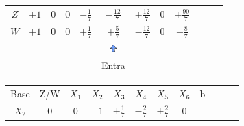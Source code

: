 \documentclass{beamer}
\begin{document}
\begin{frame}
{\begin{table}
\begin{tabular}{c c c c c c c c c c c c}
				\cellcolor{blue!100} \color{white} $\scriptstyle Z$
				& \cellcolor{yellow!50} $\scriptstyle +1$
				& \cellcolor{yellow!50} $\scriptstyle 0$
				& \cellcolor{yellow!50} $\scriptstyle 0$
				& \cellcolor{yellow!50} $\scriptstyle -\frac{1}{7}$
				& \cellcolor{gray!50} $\scriptstyle -\frac{12}{7}$
				& \cellcolor{yellow!50} $\scriptstyle +\frac{12}{7}$
				& \cellcolor{yellow!50} $\scriptstyle 0$ 
				& \cellcolor{yellow!50} $\scriptstyle +\frac{90}{7}$  \\
				\cellcolor{blue!100} \color{white} $\scriptstyle W$
				& \cellcolor{yellow!90} $\scriptstyle +1$
				& \cellcolor{yellow!90} $\scriptstyle 0$
				& \cellcolor{yellow!90} $\scriptstyle 0$
				& \cellcolor{yellow!90} $\scriptstyle +\frac{1}{7}$
				& \cellcolor{gray!50} $\scriptstyle +\frac{5}{7}$
				& \cellcolor{yellow!90} $\scriptstyle -\frac{12}{7}$
				& \cellcolor{yellow!90} $\scriptstyle 0$ 
				& \cellcolor{yellow!90} $\scriptstyle +\frac{8}{7}$  \\
				& & & & & \includegraphics[width=0.3cm,height=0.3cm]{setacima.jpg} \\
				& & & & & \scriptsize Entra \\
			\end{tabular}
		\end{table}			
	}	
	{
		\begin{table}		
			\begin{tabular}{c c c c c c c c c c c c}
				\cline{1-8} 
				\cellcolor{blue!100} \color{white} \scriptsize Base 
				&\cellcolor{blue!100} \color{white} \scriptsize Z/W
				&\cellcolor{blue!100} \color{red} $\scriptstyle X_1$ 
				&\cellcolor{blue!100} \color{red} $\scriptstyle X_2$ 
				&\cellcolor{blue!100} \color{white}   $\scriptstyle X_3$ 
				&\cellcolor{blue!100} \color{white} $\scriptstyle X_4$ 
				&\cellcolor{blue!100} \color{white}   $\scriptstyle X_5$ 
				&\cellcolor{blue!100} \color{red}   $\scriptstyle X_6$ 
				&\cellcolor{blue!100} \color{white} \scriptsize b
				&
				&
				& \\
				\cellcolor{blue!100} \color{red} $\scriptstyle X_2$
				& \cellcolor{yellow!50} $\scriptstyle 0$
				& \cellcolor{yellow!50} $\scriptstyle 0$
				& \cellcolor{yellow!50} $\scriptstyle +1$
				& \cellcolor{yellow!50} $\scriptstyle +\frac{1}{7}$
				& \cellcolor{gray!50} $\scriptstyle -\frac{2}{7}$
				& \cellcolor{yellow!50} $\scriptstyle +\frac{2}{7}$
				& \cellcolor{yellow!50} $\scriptstyle 0$

\end{tabular}
\end{table}}
\end{frame}
\end{document}
